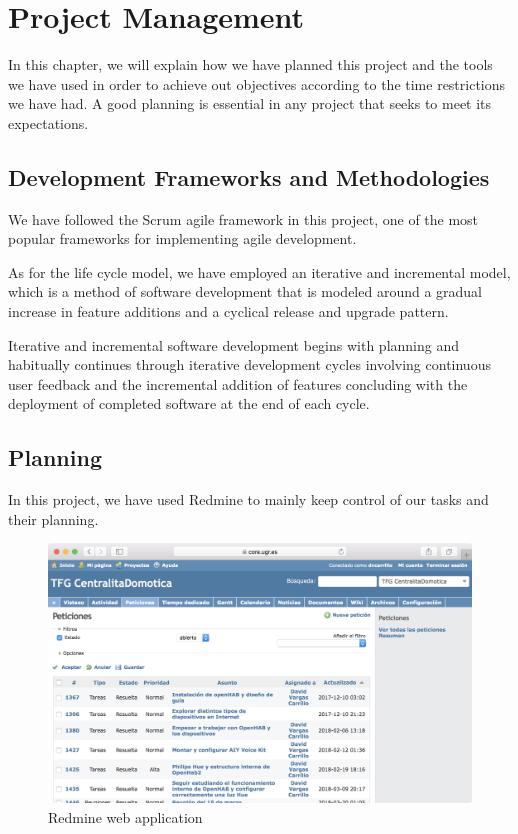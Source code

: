 \chapter{Project Management}

In this chapter, we will explain how we have planned this project and the tools we have used in order to achieve out objectives 
according to the time restrictions we have had. A good planning is essential in any project that seeks to meet its expectations.

\section{Development Frameworks and Methodologies}
We have followed the Scrum agile framework in this project, one of the most popular frameworks for implementing agile development.

As for the life cycle model, we have employed an iterative and incremental model, which is a method of software development that is 
modeled around a gradual increase in feature additions and a cyclical release and upgrade pattern.\cite{techopediaIterative}

Iterative and incremental software development begins with planning and habitually continues through iterative development cycles 
involving continuous user feedback and the incremental addition of features concluding with the deployment of completed software 
at the end of each cycle. 

\bigskip
\section{Planning}
In this project, we have used Redmine to mainly keep control of our tasks and their planning.

\begin{figure}
	\centering
	\includegraphics[width=1\textwidth]{images/Chapter_02/redmine.png}
	\caption{Redmine web application}
	\label{fig:redmine}
\end{figure}

